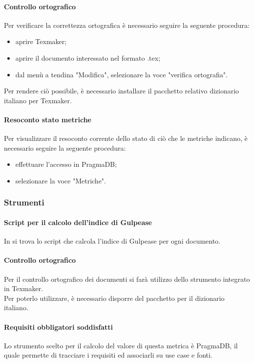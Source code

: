 \paragraph{Controllo ortografico}
Per verificare la correttezza ortografica è necessario seguire la seguente procedura:
\begin{itemize}
	\item aprire Texmaker;
	\item aprire il documento interessato nel formato .tex;
	\item dal menù a tendina "Modifica", selezionare la voce "verifica ortografia".
\end{itemize}
Per rendere ciò possibile, è necessario installare il pacchetto relativo dizionario italiano per Texmaker.
\paragraph{Resoconto stato metriche}
Per visualizzare il resoconto corrente dello stato di ciò che le metriche indicano, è necessario seguire la seguente procedura:
\begin{itemize}
	\item effettuare l'accesso in PragmaDB;
	\item selezionare la voce "Metriche".
\end{itemize}
\subsubsection{Strumenti}
\paragraph{Script per il calcolo dell'indice di Gulpease}
In \GulScript{} si trova lo script che calcola l'indice di Gulpease per ogni documento.
\paragraph{Controllo ortografico}
Per il controllo ortografico dei documenti si farà utilizzo dello strumento integrato in Texmaker.\\
Per poterlo utilizzare, è necessario disporre del pacchetto per il dizionario italiano.

\paragraph{Requisiti obbligatori soddisfatti}
Lo strumento scelto per il calcolo del valore di questa metrica è PragmaDB, il quale permette di tracciare i requisiti ed associarli su use case e fonti.
